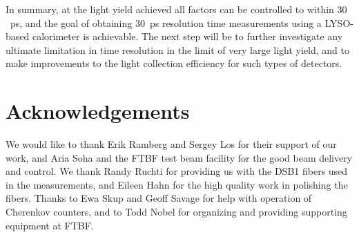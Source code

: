 \documentclass[12pt]{article}
\begin{document}
In summary, at the light yield achieved all factors can be controlled
to within $30$~ps, and the goal of obtaining $30$~ps
resolution time measurements using a LYSO-based calorimeter
is achievable. The next step will be to further 
investigate any ultimate limitation in time 
resolution in the limit of very large light yield,
and to make improvements to the light collection efficiency 
for such types of detectors.

\section{Acknowledgements}
We would like to thank Erik Ramberg and Sergey Los for their support 
of our work, and Aria Soha and the FTBF test beam facility for the
good beam delivery and control. We thank Randy Ruchti for providing us
with the DSB1 fibers used in the measurements, and Eileen Hahn for the
high quality work in polishing the fibers. Thanks to Ewa Skup and Geoff
Savage for help with operation of Cherenkov counters, and to Todd Nobel
for organizing and providing supporting equipment at FTBF.


{}

\end{document}
